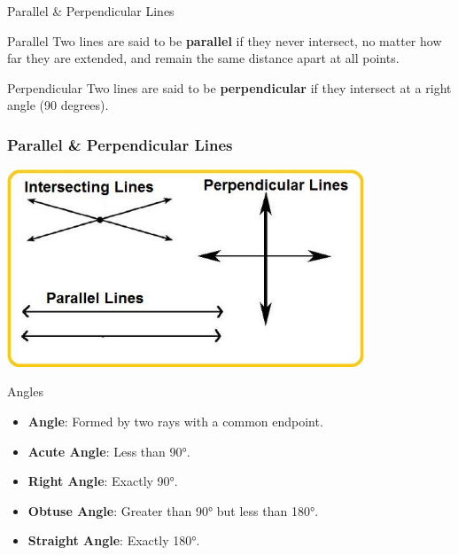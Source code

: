 \documentclass{beamer}
\begin{document}
\begin{frame}{Parallel \& Perpendicular Lines}
    \begin{block}{Parallel}
      Two lines are said to be \textbf{parallel} if they never intersect, no matter how far they are extended, and remain the same distance apart at all points.
    \end{block}
    \begin{block}{Perpendicular}
        Two lines are said to be \textbf{perpendicular} if they intersect at a right angle (90 degrees).
    \end{block}
  \end{frame}


  \begin{frame}
    \frametitle{Parallel \& Perpendicular Lines}
    \begin{center}
        \includegraphics[width=0.8\textwidth]{parallel_perpendicular.jpg} %
    \end{center}
\end{frame}




\begin{frame}{Angles}
    \begin{itemize}
        \item \textbf{Angle}: Formed by two rays with a common endpoint.
        \item \textbf{Acute Angle}: Less than 90°.
        \item \textbf{Right Angle}: Exactly 90°.
        \item \textbf{Obtuse Angle}: Greater than 90° but less than 180°.
        \item \textbf{Straight Angle}: Exactly 180°.
    \end{itemize}
\end{frame}
\end{document}
